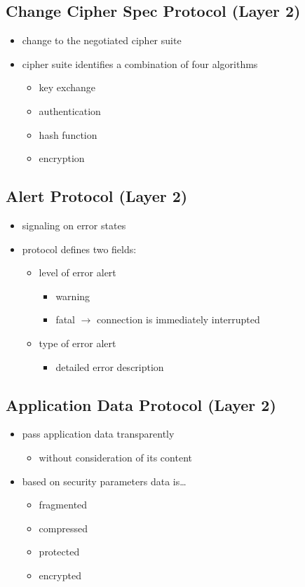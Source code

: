 \documentclass[11pt]{article}
\begin{document}
\subsection{Change Cipher Spec Protocol (Layer 2)}
\label{sec:org734de4d}
\begin{itemize}
\item change to the negotiated cipher suite
\item cipher suite identifies a combination of four algorithms
\begin{itemize}
\item key exchange
\item authentication
\item hash function
\item encryption
\end{itemize}
\end{itemize}

\subsection{Alert Protocol (Layer 2)}
\label{sec:org921007b}
\begin{itemize}
\item signaling on error states
\item protocol defines two fields:
\begin{itemize}
\item level of error alert
\begin{itemize}
\item warning
\item fatal \(\rightarrow\) connection is immediately interrupted
\end{itemize}
\item type of error alert
\begin{itemize}
\item detailed error description
\end{itemize}
\end{itemize}
\end{itemize}

\subsection{Application Data Protocol (Layer 2)}
\label{sec:org2f79164}
\begin{itemize}
\item pass application data transparently
\begin{itemize}
\item without consideration of its content
\end{itemize}
\item based on security parameters data is\ldots{}
\begin{itemize}
\item fragmented
\item compressed
\item protected
\item encrypted
\end{itemize}
\end{itemize}
\end{document}
